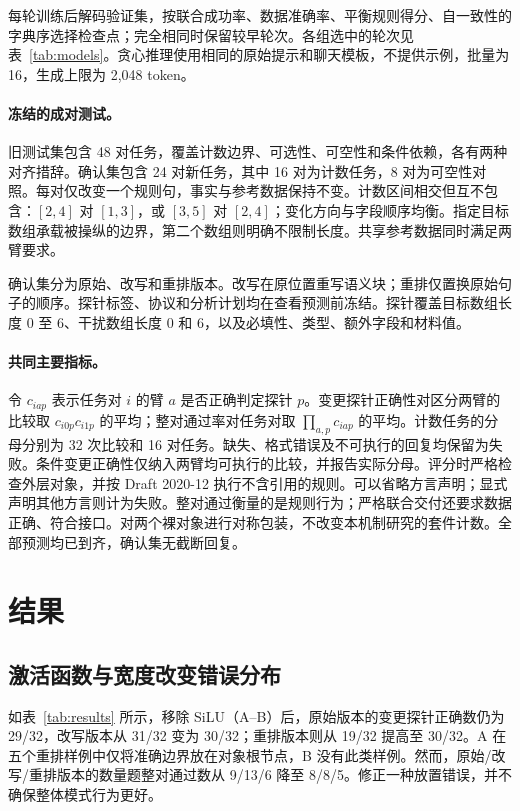 每轮训练后解码验证集，按联合成功率、数据准确率、平衡规则得分、自一致性的字典序选择检查点；完全相同时保留较早轮次。各组选中的轮次见表~\ref{tab:models}。贪心推理使用相同的原始提示和聊天模板，不提供示例，批量为 16，生成上限为 2,048 token。

\paragraph{冻结的成对测试。}
旧测试集包含 48 对任务，覆盖计数边界、可选性、可空性和条件依赖，各有两种对齐措辞。确认集包含 24 对新任务，其中 16 对为计数任务，8 对为可空性对照。每对仅改变一个规则句，事实与参考数据保持不变。计数区间相交但互不包含：$[2,4]$ 对 $[1,3]$，或 $[3,5]$ 对 $[2,4]$；变化方向与字段顺序均衡。指定目标数组承载被操纵的边界，第二个数组则明确不限制长度。共享参考数据同时满足两臂要求。

确认集分为原始、改写和重排版本。改写在原位置重写语义块；重排仅置换原始句子的顺序。探针标签、协议和分析计划均在查看预测前冻结。探针覆盖目标数组长度 0 至 6、干扰数组长度 0 和 6，以及必填性、类型、额外字段和材料值。

\paragraph{共同主要指标。}
令 $c_{iap}$ 表示任务对 $i$ 的臂 $a$ 是否正确判定探针 $p$。变更探针正确性对区分两臂的比较取 $c_{i0p}c_{i1p}$ 的平均；整对通过率对任务对取 $\prod_{a,p}c_{iap}$ 的平均。计数任务的分母分别为 32 次比较和 16 对任务。缺失、格式错误及不可执行的回复均保留为失败。条件变更正确性仅纳入两臂均可执行的比较，并报告实际分母。评分时严格检查外层对象，并按 Draft 2020-12 执行不含引用的规则。可以省略方言声明；显式声明其他方言则计为失败。整对通过衡量的是规则行为；严格联合交付还要求数据正确、符合接口。对两个裸对象进行对称包装，不改变本机制研究的套件计数。全部预测均已到齐，确认集无截断回复。

\section{结果}
\ResultsTable

\subsection{激活函数与宽度改变错误分布}
如表~\ref{tab:results} 所示，移除 SiLU（A--B）后，原始版本的变更探针正确数仍为 29/32，改写版本从 31/32 变为 30/32；重排版本则从 19/32 提高至 30/32。A 在五个重排样例中仅将准确边界放在对象根节点，B 没有此类样例。然而，原始/改写/重排版本的数量题整对通过数从 9/13/6 降至 8/8/5。修正一种放置错误，并不确保整体模式行为更好。

